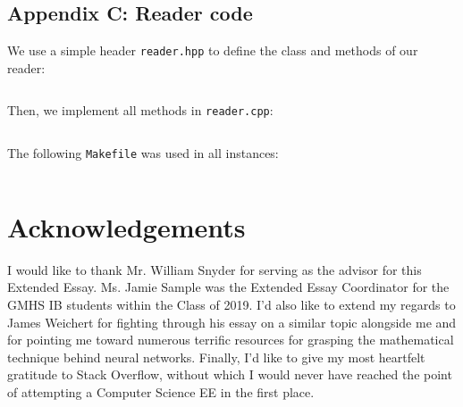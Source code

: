\documentclass{article}
\begin{document}
\label{sec:appendix_c}
\subsection{Appendix C: Reader code}
We use a simple header \texttt{reader.hpp} to define the class and methods of our reader:
\inputminted{cpp}{code/reader.hpp}
Then, we implement all methods in \texttt{reader.cpp}:
\inputminted{cpp}{code/reader.cpp}

The following \texttt{Makefile} was used in all instances:
\inputminted{makefile}{code/Makefile}

\section{Acknowledgements}
I would like to thank Mr. William Snyder for serving as the advisor for this Extended Essay. Ms. Jamie Sample was the Extended Essay Coordinator for the GMHS IB students within the Class of 2019. I'd also like to extend my regards to James Weichert for fighting through his essay on a similar topic alongside me and for pointing me toward numerous terrific resources for grasping the mathematical technique behind neural networks. Finally, I'd like to give my most heartfelt gratitude to Stack Overflow, without which I would never have reached the point of attempting a Computer Science EE in the first place.


\end{document}
